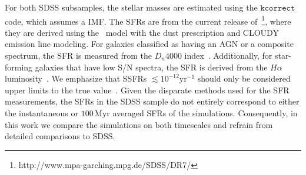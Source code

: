 \documentclass[tighten, preprint]{aastex62}
\begin{document}
For both SDSS subsamples, the stellar masses are estimated using the 
\citet{blanton2007} $\mathtt{kcorrect}$ code, which assumes a 
\cite{chabrier2003} IMF. The SFRs are from the current release 
of~\citet{brinchmann2004}\footnote{http://www.mpa-garching.mpg.de/SDSS/DR7/}, 
where they are derived using the~\cite{bruzuala.1993} model with the 
\cite{charlot2000} dust prescription and CLOUDY \citep[version C90.04;][]{ferland1996}
emission line modeling. For galaxies classified as having an AGN or a 
composite spectrum, the SFR is measured from the $D_n4000$ index~\citep{balogh1998}. 
Additionally, for star-forming galaxies that have low S/N spectra, the SFR 
is derived from the $H{\alpha}$ luminosity~\citep{brinchmann2004}. 
We emphasize that SSFRs $\lesssim 10^{-12} \mathrm{yr}^{-1}$ should only be 
considered upper limits to the true value~\citep{salim2007}.
Given the disparate methods used for the SFR measurements, the SFRs in 
the SDSS sample do not entirely correspond to either the instantaneous 
or $100\,\mathrm{Myr}$ averaged SFRs of the simulations. Consequently, 
in this work we compare the simulations on both timescales and refrain 
from detailed comparisons to SDSS. 

\end{document}
